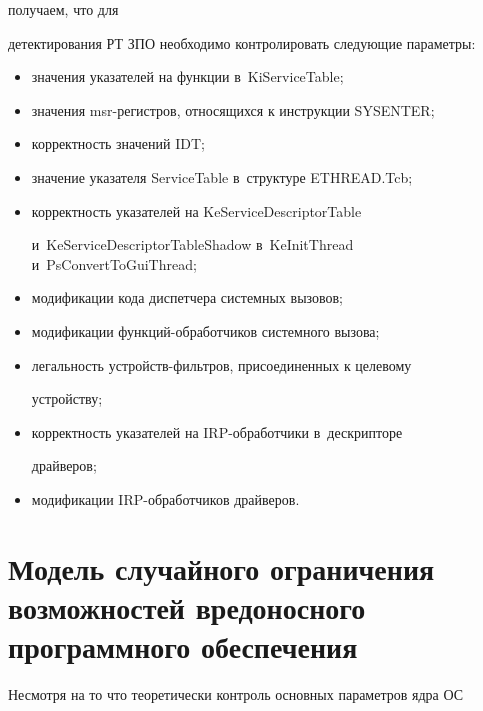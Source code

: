   получаем, что для 


детектирования РТ ЗПО необходимо контролировать следующие параметры:


  \begin{itemize}


\item значения указателей на функции в~{\sf KiServiceTable};


\item значения {\sf msr}-регистров, относящихся к инструкции {\sf SYSENTER};


\item корректность значений {\sf IDT};


\item значение указателя {\sf ServiceTable} в~структуре {\sf ETHREAD.Tcb};


\item корректность указателей на {\sf KeServiceDescriptorTable}\linebreak 


и~\mbox{\sf KeServiceDescriptorTableShadow} в~{\sf KeInitThread} и~{\sf PsConvertToGuiThread};


\item модификации кода диспетчера системных вызовов;


\item модификации функций-обработчиков системного вызова;


\item легальность устройств-фильт\-ров, присоединенных к целевому 


устройству;


\item корректность указателей на IRP-обра\-бот\-чи\-ки в~дескрипторе 


драйверов;


\item модификации IRP-обработчиков драйверов.


\end{itemize}








\section{Модель случайного ограничения возможностей вредоносного программного обеспечения}





  Несмотря на то что теоретически контроль основных параметров ядра ОС 


